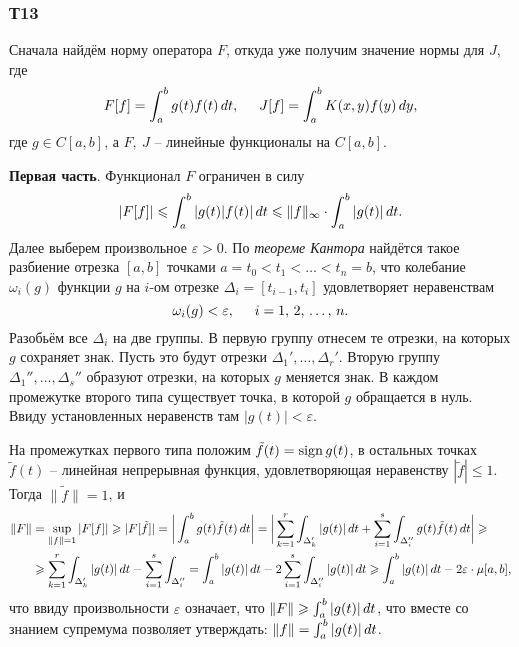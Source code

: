 \subsubsection*{Т13}


Сначала  найдём норму оператора $F$, откуда уже получим значение нормы для $J$, где
\begin{equation*}
    F[f] = \int_a^b g(t) f(t) \, d t,
    \hspace{5 mm} 
    J[f] = \int_{a}^{b} K(x, y) f(y) \, d y,
\end{equation*}
где $g\in C[a,b]$, а $F, \ J$ -- линейные функционалы на $C[a, b]$. 


\textbf{Первая часть}. Функционал $F$ ограничен в силу
\begin{equation*}
    |F[f]| \leqslant \int_{a}^{b} |g(t) |f(t)| \, d t \leqslant \|f\|_\infty \cdot \int_{a}^{b} |g(t)| \, d t.
\end{equation*}
Далее выберем произвольное $\varepsilon  > 0$. По \textit{теореме Кантора} найдётся такое разбиение отрезка $[a, b]$ точками $a=t_0 < t_1 < \ldots < t_n = b$, что колебание $\omega_i(g)$ функции $g$ на $i$-ом отрезке $\Delta_i = [t_{i-1}, t_i]$ удовлетворяет неравенствам 
\begin{equation*}
    \omega_i(g) < \varepsilon, \hspace{5 mm} i = 1,\, 2,\, \ldots,\, n.
\end{equation*}
Разобьём все $\Delta_i$ на две группы. В первую группу отнесем те отрезки, на которых $g$ сохраняет знак. Пусть это будут отрезки $\Delta_1',\ldots,\Delta_r'$. Вторую группу $\Delta_1'', \ldots, \Delta_s''$ образуют отрезки, на которых $g$ меняется знак. В каждом промежутке второго типа существует точка, в которой $g$ обращается в нуль. Ввиду установленных неравенств там $|g(t)|<\varepsilon$. 

На промежутках первого типа положим $\tilde{f}(t) = \mathop{\mathrm{sign}}\nolimits g(t)$, в остальных точках $\tilde{f}(t)$ -- линейная непрерывная функция, удовлетворяющая неравенству $|\tilde{f}| \leq 1$. Тогда $\|\tilde{f}\|=1$, и 
\begin{align*}
    \|F\| &= \sup_{\|f\|=1} |F[f]| \geqslant |F[\tilde{f}]| = \bigg|
        \int_a^b g(t) \tilde{f}(t) \, d t
    \bigg| = 
    \bigg|
        \sum_{k=1}^{r} \int_{\Delta'_k} |g(t)|\, d t + \sum_{i=1}^{s} \int_{\Delta''_i} g(t) \tilde{f}(t) \, d t
    \bigg| 
    \geqslant \\ &\geqslant
    \sum_{k=1}^{r}  \int_{\Delta'_k} |g(t)| \, d t - 
    \sum_{i=1}^{s} \int_{\Delta_i''} = \int_a^b |g(t)| \, d t - 
    2 \sum_{i=1}^{s}  \int_{\Delta''_i} |g(t)| \, d t \geqslant \int_{a}^{b} |g(t)| \, d t - 2 \varepsilon \cdot \mu[a, b],
\end{align*}
что ввиду произвольности $\varepsilon$ означает, что $\|F\|\geqslant \int_a^b |g(t)| \, d t$, что вместе со знанием супремума позволяет утверждать: $\|f\|=\int_a^b |g(t)| \, d t$.


